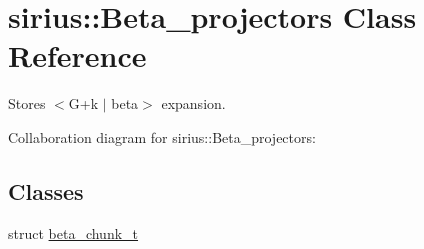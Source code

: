 \hypertarget{classsirius_1_1_beta__projectors}{}\section{sirius\+:\+:Beta\+\_\+projectors Class Reference}
\label{classsirius_1_1_beta__projectors}


Stores $<$G+k $\vert$ beta$>$ expansion.  




Collaboration diagram for sirius\+:\+:Beta\+\_\+projectors\+:
\subsection*{Classes}
\begin{DoxyCompactItemize}
\item 
struct \hyperlink{structsirius_1_1_beta__projectors_1_1beta__chunk__t}{beta\+\_\+chunk\+\_\+t}
\end{DoxyCompactItemize}
